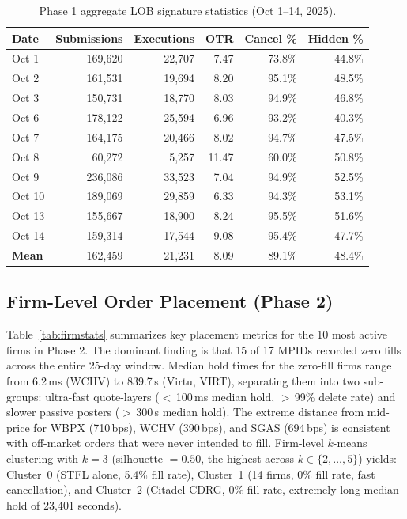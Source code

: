 \documentclass[11pt, letterpaper]{article}
\begin{document}
\begin{table}[H]
\centering
\caption{Phase 1 aggregate LOB signature statistics (Oct 1--14, 2025).}
\label{tab:step4a}
\begin{tabular}{@{} l r r r r r @{}}
\toprule
\textbf{Date} & \textbf{Submissions} & \textbf{Executions} &
\textbf{OTR} & \textbf{Cancel \%} & \textbf{Hidden \%} \\
\midrule
Oct 1  & 169,620 & 22,707 & 7.47 & 73.8\% & 44.8\% \\
Oct 2  & 161,531 & 19,694 & 8.20 & 95.1\% & 48.5\% \\
Oct 3  & 150,731 & 18,770 & 8.03 & 94.9\% & 46.8\% \\
Oct 6  & 178,122 & 25,594 & 6.96 & 93.2\% & 40.3\% \\
Oct 7  & 164,175 & 20,466 & 8.02 & 94.7\% & 47.5\% \\
Oct 8  &  60,272 &  5,257 & 11.47 & 60.0\% & 50.8\% \\
Oct 9  & 236,086 & 33,523 & 7.04 & 94.9\% & 52.5\% \\
Oct 10 & 189,069 & 29,859 & 6.33 & 94.3\% & 53.1\% \\
Oct 13 & 155,667 & 18,900 & 8.24 & 95.5\% & 51.6\% \\
Oct 14 & 159,314 & 17,544 & 9.08 & 95.4\% & 47.7\% \\
\midrule
\textbf{Mean} & 162,459 & 21,231 & 8.09 & 89.1\% & 48.4\% \\
\bottomrule
\end{tabular}
\end{table}

\subsection{Firm-Level Order Placement (Phase 2)}

Table~\ref{tab:firmstats} summarizes key placement metrics for the 10 most
active firms in Phase 2.
The dominant finding is that 15 of 17 MPIDs recorded zero fills across the
entire 25-day window.
Median hold times for the zero-fill firms range from 6.2\,ms (WCHV) to
839.7\,s (Virtu, VIRT), separating them into two sub-groups: ultra-fast quote-layers
($<$\,100\,ms median hold, $>$\,99\% delete rate) and slower passive posters
($>$\,300\,s median hold).
The extreme distance from mid-price for WBPX (710\,bps), WCHV (390\,bps),
and SGAS (694\,bps) is consistent with off-market orders that were never
intended to fill.
Firm-level $k$-means clustering with $k=3$ (silhouette $= 0.50$, the highest
across $k \in \{2,\ldots,5\}$) yields:
Cluster~0 (STFL alone, 5.4\% fill rate), Cluster~1 (14 firms, 0\% fill rate,
fast cancellation), and Cluster~2 (Citadel CDRG, 0\% fill rate, extremely
long median hold of 23,401 seconds).
\end{document}
